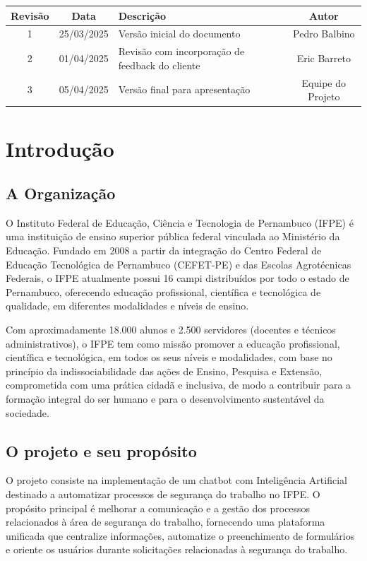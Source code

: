 \documentclass[12pt,a4paper]{article}
\renewcommand{\arraystretch}{1.2}
\begin{document}
\begin{table}[h]
\centering
\renewcommand{\arraystretch}{1.3}
\begin{tabular}{|c|c|p{8cm}|c|}
\hline
\rowcolor{gray!15}\textbf{Revisão} & \textbf{Data} & \textbf{Descrição} & \textbf{Autor} \\
\hline
1 & 25/03/2025 & Versão inicial do documento & Pedro Balbino \\
\hline
2 & 01/04/2025 & Revisão com incorporação de feedback do cliente & Eric Barreto \\
\hline
3 & 05/04/2025 & Versão final para apresentação & Equipe do Projeto \\
\hline
\end{tabular}
\end{table}

\clearpage
\tableofcontents
\thispagestyle{empty}
\clearpage

\section{Introdução}

\subsection{A Organização}
O Instituto Federal de Educação, Ciência e Tecnologia de Pernambuco (IFPE) é uma instituição de ensino superior pública federal vinculada ao Ministério da Educação. Fundado em 2008 a partir da integração do Centro Federal de Educação Tecnológica de Pernambuco (CEFET-PE) e das Escolas Agrotécnicas Federais, o IFPE atualmente possui 16 campi distribuídos por todo o estado de Pernambuco, oferecendo educação profissional, científica e tecnológica de qualidade, em diferentes modalidades e níveis de ensino.

Com aproximadamente 18.000 alunos e 2.500 servidores (docentes e técnicos administrativos), o IFPE tem como missão promover a educação profissional, científica e tecnológica, em todos os seus níveis e modalidades, com base no princípio da indissociabilidade das ações de Ensino, Pesquisa e Extensão, comprometida com uma prática cidadã e inclusiva, de modo a contribuir para a formação integral do ser humano e para o desenvolvimento sustentável da sociedade.

\subsection{O projeto e seu propósito}
O projeto consiste na implementação de um chatbot com Inteligência Artificial destinado a automatizar processos de segurança do trabalho no IFPE. O propósito principal é melhorar a comunicação e a gestão dos processos relacionados à área de segurança do trabalho, fornecendo uma plataforma unificada que centralize informações, automatize o preenchimento de formulários e oriente os usuários durante solicitações relacionadas à segurança do trabalho.
\end{document}
